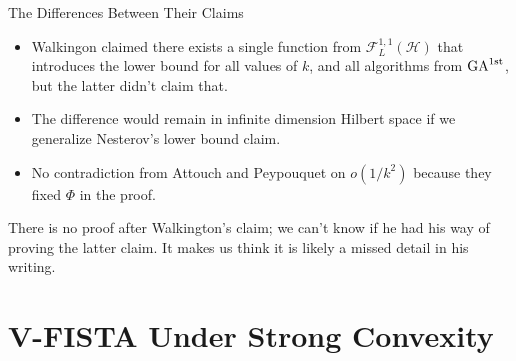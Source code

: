 \documentclass[11pt]{beamer}
\theoremstyle{definition}
\begin{document}
    \begin{frame}{The Differences Between Their Claims}
        \begin{itemize}
            \item Walkingon claimed there exists a single function from $\mathcal F_{L}^{1,1}(\mathcal H)$ that introduces the lower bound for all values of $k$, and all algorithms from $\text{GA}^{\text{1st}}$, but the latter didn't claim that. 
            \item The difference would remain in infinite dimension Hilbert space if we generalize Nesterov's lower bound claim. 
            \item No contradiction from Attouch and Peypouquet\cite{attouch_rate_2016} on $o(1/k^2)$ because they fixed $\Phi$ in the proof. 
        \end{itemize}
        There is no proof after Walkington's claim; we can't know if he had his way of proving the latter claim. 
        It makes us think it is likely a missed detail in his writing. 
    \end{frame}

 

\section{V-FISTA Under Strong Convexity}
\end{document}
